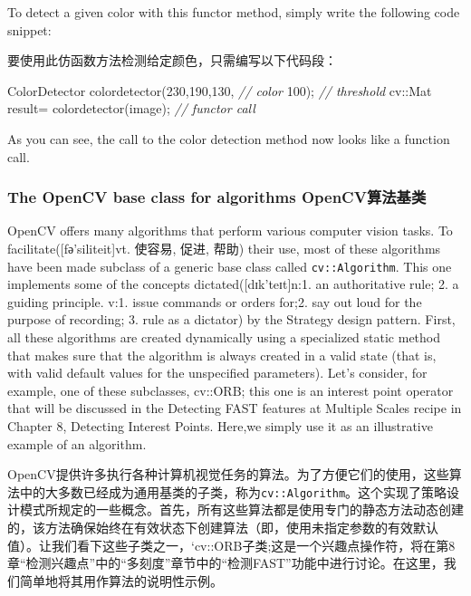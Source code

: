 \documentclass[]{article}
\newenvironment{Shaded}{}{}
\newcommand{\CommentTok}[1]{\textcolor[rgb]{0.38,0.63,0.69}{\textit{#1}}}
\newcommand{\DecValTok}[1]{\textcolor[rgb]{0.25,0.63,0.44}{#1}}
\newcommand{\NormalTok}[1]{#1}
\begin{document}
To detect a given color with this functor method, simply write the
following code snippet:

要使用此仿函数方法检测给定颜色，只需编写以下代码段：

\begin{Shaded}
\begin{Highlighting}[]
\NormalTok{ColorDetector colordetector(}\DecValTok{230}\NormalTok{,}\DecValTok{190}\NormalTok{,}\DecValTok{130}\NormalTok{, }\CommentTok{// color}
\DecValTok{100}\NormalTok{); }\CommentTok{// threshold}
\NormalTok{cv::Mat result= colordetector(image); }\CommentTok{// functor call}
\end{Highlighting}
\end{Shaded}

As you can see, the call to the color detection method now looks like a
function call.

\hypertarget{header-n1263}{%
\subsubsection{The OpenCV base class for algorithms
OpenCV算法基类}\label{header-n1263}}

OpenCV offers many algorithms that perform various computer vision
tasks. To facilitate({[}fә'siliteit{]}vt. 使容易, 促进, 帮助) their use,
most of these algorithms have been made subclass of a generic base class
called \texttt{cv::Algorithm}. This one implements some of the concepts
dictated({[}dɪk'teɪt{]}n:1. an authoritative rule; 2. a guiding
principle. v:1. issue commands or orders for;2. say out loud for the
purpose of recording; 3. rule as a dictator) by the Strategy design
pattern. First, all these algorithms are created dynamically using a
specialized static method that makes sure that the algorithm is always
created in a valid state (that is, with valid default values for the
unspecified parameters). Let's consider, for example, one of these
subclasses, cv::ORB; this one is an interest point operator that will be
discussed in the Detecting FAST features at Multiple Scales recipe in
Chapter 8, Detecting Interest Points. Here,we simply use it as an
illustrative example of an algorithm.

OpenCV提供许多执行各种计算机视觉任务的算法。为了方便它们的使用，这些算法中的大多数已经成为通用基类的子类，称为\texttt{cv::Algorithm}。这个实现了策略设计模式所规定的一些概念。首先，所有这些算法都是使用专门的静态方法动态创建的，该方法确保始终在有效状态下创建算法（即，使用未指定参数的有效默认值）。让我们看下这些子类之一，`cv::ORB子类;这是一个兴趣点操作符，将在第8章``检测兴趣点''中的``多刻度''章节中的``检测FAST''功能中进行讨论。在这里，我们简单地将其用作算法的说明性示例。
\end{document}
